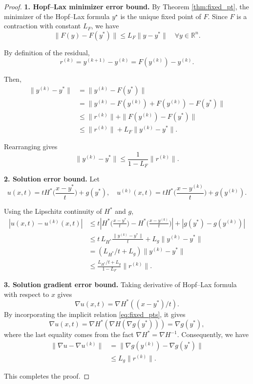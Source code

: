 \documentclass[review,hidelinks,onefignum,onetabnum]{siamart250106}
\begin{document}
\begin{proof}
\textbf{1. Hopf--Lax minimizer error bound.} 
  By Theorem \ref{thm:fixed_pt}, the minimizer of the Hopf--Lax formula $y^\star$ is the unique fixed point of \(F\).
Since \(F\) is a contraction with constant \(L_F\), we have
\[
\|F(y) - F(y^*)\| \le L_F \|y - y^*\| \quad \forall y \in \mathbb{R}^n.
\]

By definition of the residual,
\[
r^{(k)} = y^{(k+1)} - y^{(k)} = F(y^{(k)}) - y^{(k)}.
\]

Then,
\[
\begin{aligned}
\|y^{(k)} - y^*\| 
&= \|y^{(k)} - F(y^*)\| \\
&= \|y^{(k)} - F(y^{(k)}) + F(y^{(k)}) - F(y^*)\| \\
&\le \|r^{(k)}\| + \|F(y^{(k)}) - F(y^*)\| \\
&\le \|r^{(k)}\| + L_F \|y^{(k)} - y^*\|.
\end{aligned}
\]

Rearranging gives
\[
\|y^{(k)} - y^*\| \le \frac{1}{1 - L_F} \|r^{(k)}\|.
\]

\medskip
\textbf{2. Solution error bound.}  
Let
\[
u(x,t) = t H^*\Big(\frac{x - y^*}{t}\Big) + g(y^*), \quad u^{(k)}(x,t) = t H^*\Big(\frac{x - y^{(k)}}{t}\Big) + g(y^{(k)}).
\]

Using the Lipschitz continuity of \(H^*\) and \(g\),
\[
\begin{aligned}
|u(x,t) - u^{(k)}(x,t)| 
&\le t \left|H^*\Big(\frac{x - y^*}{t}\Big) - H^*\Big(\frac{x - y^{(k)}}{t}\Big)\right| + |g(y^*) - g(y^{(k)})| \\
&\le t \, L_{H^*} \frac{\|y^{(k)} - y^*\|}{t} + L_g \|y^{(k)} - y^*\| \\
&= (L_{H^*}/t + L_g) \|y^{(k)} - y^*\| \\
&\le \frac{L_{H^*}/t + L_g}{1 - L_F} \|r^{(k)}\|.
\end{aligned}
\]

\medskip
\textbf{3. Solution gradient error bound.}  
Taking derivative of Hopf--Lax formula with respect to $x$ gives
\[\nabla u(x,t) = \nabla H^*((x - y^*)/t).
\] 
By incorporating the implicit relation \eqref{eq:fixed_pts}, it
gives
\[\nabla u(x,t) = \nabla H^*(\nabla H(\nabla g(y^\ast)))=\nabla g(y^\ast),
\] 
where the last equality comes from the fact $ \nabla H^*=\nabla H^{-1}$.
Consequently, we have
\[
\begin{aligned}
\|\nabla u - \nabla u^{(k)}\| 
&= \Big\|\nabla g(y^{(k)}) - \nabla g(y^\ast)\Big\| \\
&\le L_g\| r^{(k)} \|.
\end{aligned}
\]

This completes the proof.
\end{proof}
\end{document}
